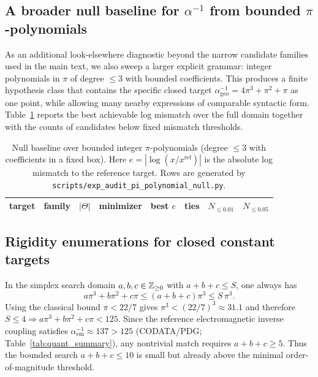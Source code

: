 \subsection{A broader null baseline for \texorpdfstring{$\alpha^{-1}$}{alpha-inv} from bounded \texorpdfstring{$\pi$}{pi}-polynomials}
\label{app:audit_pi_poly_null}

As an additional look-elsewhere diagnostic beyond the narrow candidate families used in the main text, we also sweep a larger explicit grammar:
integer polynomials in $\pi$ of degree $\le 3$ with bounded coefficients.
This produces a finite hypothesis class that contains the specific closed target $\alpha_{\mathrm{geo}}^{-1}=4\pi^3+\pi^2+\pi$ as one point, while allowing many nearby expressions of comparable syntactic form.
Table~\ref{tab:audit_pi_poly_null} reports the best achievable log mismatch over the full domain together with the counts of candidates below fixed mismatch thresholds.

\begin{table}[H]
\centering
\scriptsize
\setlength{\tabcolsep}{4pt}
\renewcommand{\arraystretch}{1.15}
\begin{tabular}{llr l r r r r}
\toprule
target & family & $|\Theta|$ & minimizer & best $e$ & ties & $N_{\le 0.01}$ & $N_{\le 0.05}$ \\
\midrule
%
\end{tabular}
\caption{Null baseline over bounded integer $\pi$-polynomials (degree $\le 3$ with coefficients in a fixed box). Here $e=|\log(x/x^{\mathrm{ref}})|$ is the absolute log mismatch to the reference target. Rows are generated by \texttt{scripts/exp\_audit\_pi\_polynomial\_null.py}.}
\label{tab:audit_pi_poly_null}
\end{table}

\subsection{Rigidity enumerations for closed constant targets}
\label{app:constant_rigidity_enumerations}

\begin{remark}
\label{rem:alpha_simplex_nonvacuous}
In the simplex search domain $a,b,c\in\mathbb{Z}_{\ge 0}$ with $a+b+c\le S$,
one always has
\[
a\pi^3+b\pi^2+c\pi \le (a+b+c)\pi^3 \le S\,\pi^3.
\]
Using the classical bound $\pi<22/7$ gives $\pi^3<(22/7)^3\approx 31.1$ and
therefore $S\le 4 \Rightarrow a\pi^3+b\pi^2+c\pi<125$.
Since the reference electromagnetic inverse coupling satisfies
$\alpha_{\mathrm{em}}^{-1}\approx 137>125$ (CODATA/PDG; Table~\ref{tab:quant_summary}),
any nontrivial match requires $a+b+c\ge 5$.
Thus the bounded search $a+b+c\le 10$ is small but already above the minimal
order-of-magnitude threshold.
\end{remark}

